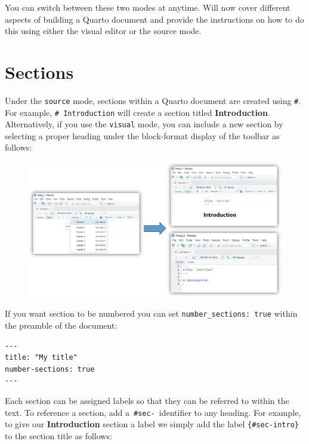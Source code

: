\documentclass[
  letterpaper,
  DIV=11,
  numbers=noendperiod]{scrartcl}
\begin{document}
You can switch between these two modes at anytime. Will now cover
different aspects of building a Quarto document and provide the
instructions on how to do this using either the visual editor or the
source mode.

\hypertarget{sections}{%
\section{Sections}\label{sections}}

Under the \texttt{source} mode, sections within a Quarto document are
created using \texttt{\#}. For example, \texttt{\#\ Introduction} will
create a section titled \textbf{Introduction}. Alternatively, if you use
the \texttt{visual} mode, you can include a new section by selecting a
proper heading under the block-format display of the toolbar as follows:

\begin{figure}

{\centering \includegraphics[width=7.64583in,height=\textheight]{images/quarto3.png}

}

\end{figure}

If you want section to be numbered you can set
\texttt{number\_sections:\ true} within the preamble of the document:

\begin{verbatim}
---
title: "My title"
number-sections: true
---
\end{verbatim}

Each section can be assigned labels so that they can be referred to
within the text. To reference a section, add
a~\texttt{\#sec-}~identifier to any heading. For example, to give our
\textbf{Introduction} section a label we simply add the label
\texttt{\{\#sec-intro\}} to the section title as follows:
\end{document}
